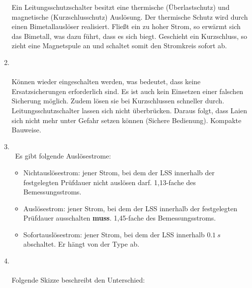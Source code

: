 \begin{enumerate}
            Ein Leitungsschutzschalter besitzt eine thermische (Überlastschutz) und magnetische (Kurzschlusschutz) Auslösung.
            Der thermische Schutz wird durch einen Bimetallauslöser realisiert. Fließt ein zu hoher Strom, so erwärmt sich das Bimetall, 
            was dazu führt, dass es sich biegt. Geschieht ein Kurzschluss, so zieht eine Magnetspule an und schaltet somit den Stromkreis sofort ab.

    \item   {} \\\\
            Können wieder eingeschalten werden, was bedeutet, dass keine Ersatzsicherungen erforderlich sind. Es ist auch kein Einsetzen einer falschen Sicherung möglich. Zudem lösen sie bei Kurzschlussen schneller durch.
            Leitungsschutzschalter lassen sich nicht überbrücken.
            Daraus folgt, dass Laien sich nicht mehr unter Gefahr setzen können (Sichere Bedienung). Kompakte Bauweise.  

    \item   {} \\\
            Es gibt folgende Auslösestrome:

            \begin{itemize}
                \item Nichtauslösestrom: jener Strom, bei dem der LSS innerhalb der festgelegten Prüfdauer nicht auslösen darf. 1,13-fache des Bemessungsstroms.
                \item Auslösestrom: jener Strom, bei dem der LSS innerhalb der festgelegten Prüfdauer ausschalten \textbf{muss}. 1,45-fache des Bemessungsstroms.
                \item Sofortauslösestrom: jener Strom, bei dem der LSS innerhalb $\SI{0.1}{s}$ abschaltet. Er hängt von der Type ab.
            \end{itemize}

    \item   {} \\\\
            Folgende Skizze beschreibt den Unterschied:


\end{enumerate}

